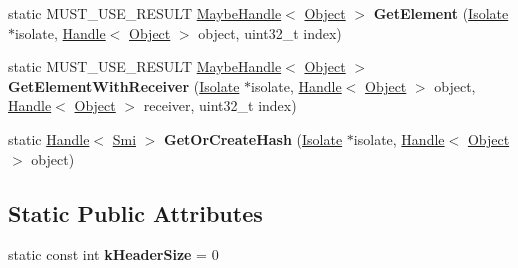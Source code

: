 \begin{DoxyCompactItemize}
\item 
\hypertarget{classv8_1_1internal_1_1_object_a38d82e0f9c0c94096d6524b34844dc1a}{}static M\+U\+S\+T\+\_\+\+U\+S\+E\+\_\+\+R\+E\+S\+U\+L\+T \hyperlink{classv8_1_1internal_1_1_maybe_handle}{Maybe\+Handle}$<$ \hyperlink{classv8_1_1internal_1_1_object}{Object} $>$ {\bfseries Get\+Element} (\hyperlink{classv8_1_1internal_1_1_isolate}{Isolate} $\ast$isolate, \hyperlink{classv8_1_1internal_1_1_handle}{Handle}$<$ \hyperlink{classv8_1_1internal_1_1_object}{Object} $>$ object, uint32\+\_\+t index)\label{classv8_1_1internal_1_1_object_a38d82e0f9c0c94096d6524b34844dc1a}

\item 
\hypertarget{classv8_1_1internal_1_1_object_ae626b611ad628a2b006314033b4fd31c}{}static M\+U\+S\+T\+\_\+\+U\+S\+E\+\_\+\+R\+E\+S\+U\+L\+T \hyperlink{classv8_1_1internal_1_1_maybe_handle}{Maybe\+Handle}$<$ \hyperlink{classv8_1_1internal_1_1_object}{Object} $>$ {\bfseries Get\+Element\+With\+Receiver} (\hyperlink{classv8_1_1internal_1_1_isolate}{Isolate} $\ast$isolate, \hyperlink{classv8_1_1internal_1_1_handle}{Handle}$<$ \hyperlink{classv8_1_1internal_1_1_object}{Object} $>$ object, \hyperlink{classv8_1_1internal_1_1_handle}{Handle}$<$ \hyperlink{classv8_1_1internal_1_1_object}{Object} $>$ receiver, uint32\+\_\+t index)\label{classv8_1_1internal_1_1_object_ae626b611ad628a2b006314033b4fd31c}

\item 
\hypertarget{classv8_1_1internal_1_1_object_abc115f2af2f366a5b24423b179397cf6}{}static \hyperlink{classv8_1_1internal_1_1_handle}{Handle}$<$ \hyperlink{classv8_1_1internal_1_1_smi}{Smi} $>$ {\bfseries Get\+Or\+Create\+Hash} (\hyperlink{classv8_1_1internal_1_1_isolate}{Isolate} $\ast$isolate, \hyperlink{classv8_1_1internal_1_1_handle}{Handle}$<$ \hyperlink{classv8_1_1internal_1_1_object}{Object} $>$ object)\label{classv8_1_1internal_1_1_object_abc115f2af2f366a5b24423b179397cf6}

\end{DoxyCompactItemize}
\subsection*{Static Public Attributes}
\begin{DoxyCompactItemize}
\item 
\hypertarget{classv8_1_1internal_1_1_object_ad3351fa81dab11402a320cbc39482151}{}static const int {\bfseries k\+Header\+Size} = 0\label{classv8_1_1internal_1_1_object_ad3351fa81dab11402a320cbc39482151}

\end{DoxyCompactItemize}

